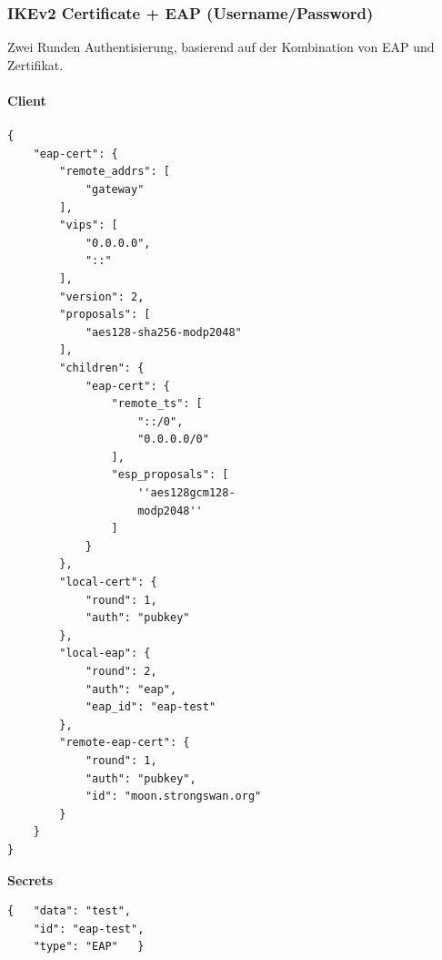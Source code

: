 \subsubsection{	IKEv2 Certificate + EAP (Username/Password)}
Zwei Runden Authentisierung, basierend auf der Kombination von EAP und Zertifikat.\\
\noindent\begin{minipage}[t]{0.5\textwidth}
\vspace{0pt}
\paragraph{Client}\mbox{}\medskip
\begin{lstlisting}[style=BashInputStyle]
{
    "eap-cert": {
        "remote_addrs": [
            "gateway"
        ],
        "vips": [
            "0.0.0.0",
            "::"
        ],
        "version": 2,
        "proposals": [
            "aes128-sha256-modp2048"
        ],
        "children": {
            "eap-cert": {
                "remote_ts": [
                    "::/0",
                    "0.0.0.0/0"
                ],
                "esp_proposals": [
                    ''aes128gcm128-
                    modp2048''
                ]
            }
        },
        "local-cert": {
            "round": 1,
            "auth": "pubkey"
        },
        "local-eap": {
            "round": 2,
            "auth": "eap",
            "eap_id": "eap-test"
        },
        "remote-eap-cert": {
            "round": 1,
            "auth": "pubkey",
            "id": "moon.strongswan.org"
        }
    }
}
\end{lstlisting}
\hspace*{18pt}\textbf{Secrets}\mbox{}\medskip
\begin{lstlisting}[style=BashInputStyle]
{   "data": "test",
    "id": "eap-test",
    "type": "EAP"   }
\end{lstlisting}
\end{minipage}
\hfill
